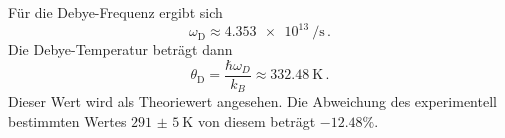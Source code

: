 Für die Debye-Frequenz ergibt sich
\begin{equation}
  \omega_\text{D} \approx \SI{4.353e13}{\per\second}\,.
\end{equation}
Die Debye-Temperatur beträgt dann
\begin{equation*}
  \theta_\text{D} = \frac{\hbar \omega_D}{k_B} \approx \SI{332.48}{\kelvin} \,.
\end{equation*}
Dieser Wert wird als Theoriewert angesehen. Die Abweichung des experimentell bestimmten Wertes $\SI{291(5)}{\kelvin}$ von diesem beträgt $-12.48\%$.
